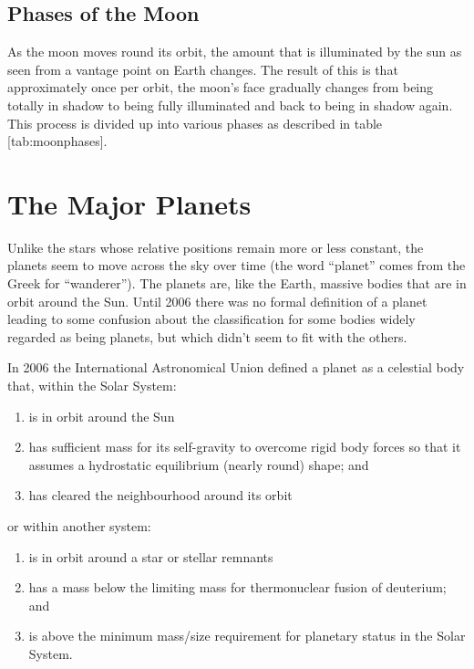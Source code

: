\subsection{Phases of the Moon}\label{phases-of-the-moon}

As the moon moves round its orbit, the amount that is illuminated by the
sun as seen from a vantage point on Earth changes. The result of this is
that approximately once per orbit, the moon's face gradually changes
from being totally in shadow to being fully illuminated and back to
being in shadow again. This process is divided up into various phases as
described in table {[}tab:moonphases{]}.

\section{The Major Planets}\label{the-major-planets}

Unlike the stars whose relative positions remain more or less constant,
the planets seem to move across the sky over time (the word ``planet''
comes from the Greek for ``wanderer''). The planets are, like the Earth,
massive bodies that are in orbit around the Sun. Until 2006 there was no
formal definition of a planet leading to some confusion about the
classification for some bodies widely regarded as being planets, but
which didn't seem to fit with the others.

In 2006 the International Astronomical Union defined a planet as a
celestial body that, within the Solar System:

\begin{enumerate}
\item
  is in orbit around the Sun
\item
  has sufficient mass for its self-gravity to overcome rigid body forces
  so that it assumes a hydrostatic equilibrium (nearly round) shape; and
\item
  has cleared the neighbourhood around its orbit
\end{enumerate}

or within another system:

\begin{enumerate}
\item
  is in orbit around a star or stellar remnants
\item
  has a mass below the limiting mass for thermonuclear fusion of
  deuterium; and
\item
  is above the minimum mass/size requirement for planetary status in the
  Solar System.
\end{enumerate}

